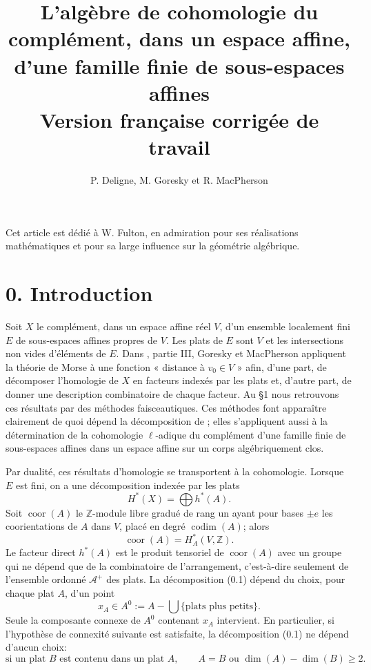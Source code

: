 \documentclass[11pt]{article}
\title{L'algèbre de cohomologie du complément, dans un espace affine, d'une famille finie de sous-espaces affines\\\large Version française corrigée de travail}
\author{P. Deligne, M. Goresky et R. MacPherson}
\date{}
\theoremstyle{definition}
\newcommand{\ZZ}{\mathbb Z}
\newcommand{\codim}{\operatorname{codim}}
\newcommand{\coor}{\operatorname{coor}}
\begin{document}
\maketitle

Cet article est dédié à W. Fulton, en admiration pour ses réalisations mathématiques et pour sa large influence sur la géométrie algébrique.

\section*{0. Introduction}

Soit $X$ le complément, dans un espace affine réel $V$, d'un ensemble localement fini $E$ de sous-espaces affines propres de $V$. Les plats de $E$ sont $V$ et les intersections non vides d'éléments de $E$. Dans \cite{GM}, partie III, Goresky et MacPherson appliquent la théorie de Morse à une fonction « distance à $v_0\in V$ » afin, d'une part, de décomposer l'homologie de $X$ en facteurs indexés par les plats et, d'autre part, de donner une description combinatoire de chaque facteur. Au §1 nous retrouvons ces résultats par des méthodes faisceautiques. Ces méthodes font apparaître clairement de quoi dépend la décomposition de \cite{GM}; elles s'appliquent aussi à la détermination de la cohomologie $\ell$-adique du complément d'une famille finie de sous-espaces affines dans un espace affine sur un corps algébriquement clos.

Par dualité, ces résultats d'homologie se transportent à la cohomologie. Lorsque $E$ est fini, on a une décomposition indexée par les plats
\begin{equation}
H^*(X)=\bigoplus h^*(A). \tag{0.1}
\end{equation}
Soit $\coor(A)$ le $\ZZ$-module libre gradué de rang un ayant pour bases $\pm e$ les coorientations de $A$ dans $V$, placé en degré $\codim(A)$; alors
\begin{equation}
\coor(A)=H_A^*(V,\ZZ). \tag{0.2}
\end{equation}
Le facteur direct $h^*(A)$ est le produit tensoriel de $\coor(A)$ avec un groupe qui ne dépend que de la combinatoire de l'arrangement, c'est-à-dire seulement de l'ensemble ordonné $\mathcal A^+$ des plats. La décomposition (0.1) dépend du choix, pour chaque plat $A$, d'un point
\[
 x_A\in A^0:=A-\bigcup\{\text{plats plus petits}\}.
\]
Seule la composante connexe de $A^0$ contenant $x_A$ intervient. En particulier, si l'hypothèse de connexité suivante est satisfaite, la décomposition (0.1) ne dépend d'aucun choix:
\begin{equation*}
\text{si un plat } B \text{ est contenu dans un plat } A,
\qquad A=B \text{ ou } \dim(A)-\dim(B)\geq 2.\tag{CONN}
\end{equation*}
\end{document}
